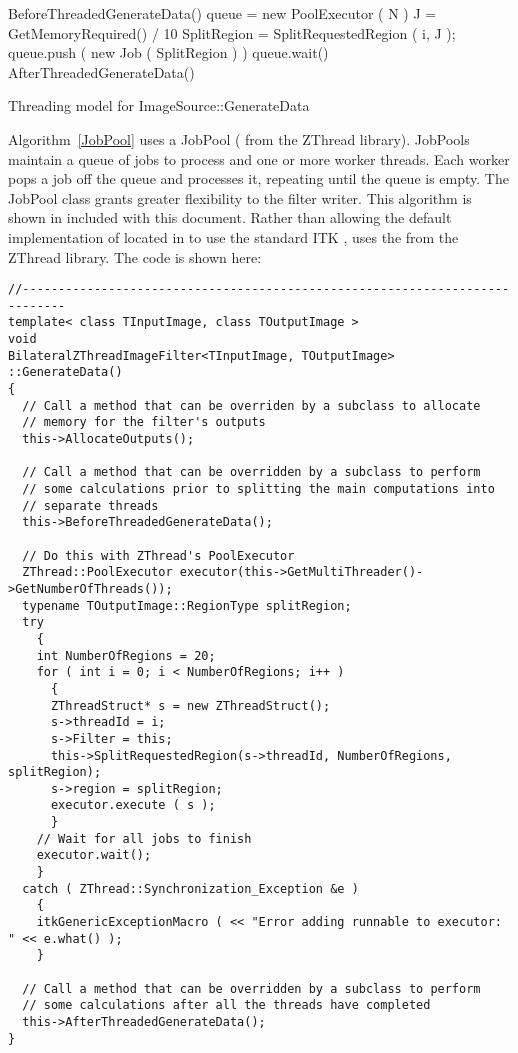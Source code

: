 \documentclass{InsightArticle}
\begin{document}
\begin{algorithm}
  \begin{algorithmic}
    \STATE BeforeThreadedGenerateData()
    \STATE queue = new PoolExecutor ( N ) 
    \STATE J = GetMemoryRequired() / 10 
      \STATE SplitRegion = SplitRequestedRegion ( i, J );
      \STATE queue.push ( new Job ( SplitRegion ) )
    \ENDFOR
    \STATE queue.wait() 
    \STATE AfterThreadedGenerateData() 
  \end{algorithmic}
  \label{JobPool}
  \caption{Threading model for ImageSource::GenerateData  }
\end{algorithm}

Algorithm~\ref{JobPool} uses a JobPool ( from the ZThread library).  JobPools maintain a queue of jobs to process and one or more worker threads.  Each worker pops a job off the queue and processes it, repeating until the queue is empty.  The JobPool class grants greater flexibility to the filter writer.  This algorithm is shown in  included with this document.  Rather than allowing the default implementation of  located in  to use the standard ITK ,  uses the  from the ZThread library.  The code is shown here:

\begin{verbatim}
//----------------------------------------------------------------------------
template< class TInputImage, class TOutputImage >
void
BilateralZThreadImageFilter<TInputImage, TOutputImage>
::GenerateData()
{
  // Call a method that can be overriden by a subclass to allocate
  // memory for the filter's outputs
  this->AllocateOutputs();
  
  // Call a method that can be overridden by a subclass to perform
  // some calculations prior to splitting the main computations into
  // separate threads
  this->BeforeThreadedGenerateData();

  // Do this with ZThread's PoolExecutor
  ZThread::PoolExecutor executor(this->GetMultiThreader()->GetNumberOfThreads());
  typename TOutputImage::RegionType splitRegion;
  try
    {
    int NumberOfRegions = 20;
    for ( int i = 0; i < NumberOfRegions; i++ )
      {
      ZThreadStruct* s = new ZThreadStruct();
      s->threadId = i;
      s->Filter = this;
      this->SplitRequestedRegion(s->threadId, NumberOfRegions, splitRegion);
      s->region = splitRegion;
      executor.execute ( s );
      }
    // Wait for all jobs to finish
    executor.wait();
    }
  catch ( ZThread::Synchronization_Exception &e )
    {
    itkGenericExceptionMacro ( << "Error adding runnable to executor: " << e.what() );
    }

  // Call a method that can be overridden by a subclass to perform
  // some calculations after all the threads have completed
  this->AfterThreadedGenerateData();
}
\end{verbatim}
\end{document}
